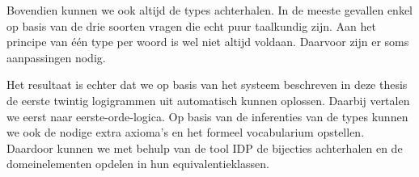 Bovendien kunnen we ook altijd de types achterhalen. In de meeste gevallen enkel op basis van de drie soorten vragen die echt puur taalkundig zijn. Aan het principe van één type per woord is wel niet altijd voldaan. Daarvoor zijn er soms aanpassingen nodig.

Het resultaat is echter dat we op basis van het systeem beschreven in deze thesis de eerste twintig logigrammen uit \cite{logigrammen} automatisch kunnen oplossen. Daarbij vertalen we eerst naar eerste-orde-logica. Op basis van de inferenties van de types kunnen we ook de nodige extra axioma's en het formeel vocabularium opstellen. Daardoor kunnen we met behulp van de tool IDP \cite{IDP} de bijecties achterhalen en de domeinelementen opdelen in hun equivalentieklassen.
